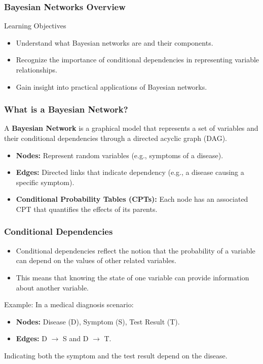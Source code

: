 \documentclass[aspectratio=169]{beamer}
\begin{document}
\begin{frame}[fragile]
    \frametitle{Bayesian Networks Overview}
    \begin{block}{Learning Objectives}
        \begin{itemize}
            \item Understand what Bayesian networks are and their components.
            \item Recognize the importance of conditional dependencies in representing variable relationships.
            \item Gain insight into practical applications of Bayesian networks.
        \end{itemize}
    \end{block}
\end{frame}

\begin{frame}[fragile]
    \frametitle{What is a Bayesian Network?}
    A \textbf{Bayesian Network} is a graphical model that represents a set of variables and their conditional dependencies through a directed acyclic graph (DAG).
    \begin{itemize}
        \item \textbf{Nodes:} Represent random variables (e.g., symptoms of a disease).
        \item \textbf{Edges:} Directed links that indicate dependency (e.g., a disease causing a specific symptom).
        \item \textbf{Conditional Probability Tables (CPTs):} Each node has an associated CPT that quantifies the effects of its parents.
    \end{itemize}
\end{frame}

\begin{frame}[fragile]
    \frametitle{Conditional Dependencies}
    \begin{itemize}
        \item Conditional dependencies reflect the notion that the probability of a variable can depend on the values of other related variables.
        \item This means that knowing the state of one variable can provide information about another variable.
    \end{itemize}
    \begin{block}{Example:}
        In a medical diagnosis scenario:
        \begin{itemize}
            \item \textbf{Nodes:} Disease (D), Symptom (S), Test Result (T).
            \item \textbf{Edges:} D $\rightarrow$ S and D $\rightarrow$ T.
        \end{itemize}
        Indicating both the symptom and the test result depend on the disease.
    \end{block}
\end{frame}
\end{document}
